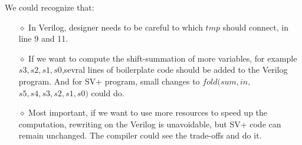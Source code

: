 We could recognize that:
\begin{itemize}
  \item[$\diamond$] In Verilog, designer needs to be careful to which $tmp$ should connect, in line 9 and 11.
  \item[$\diamond$] If we want to compute the shift-summation of more variables, for example $s3,s2,s1,s0$,sevral
                    lines of boilerplate code should be added to the Verilog program. And for SV+ program, small
                    changes to $fold(sum,in,$ $s5,s4,s3,s2,s1,s0)$ could do.
  \item[$\diamond$] Most important, if we want to use more resources to speed up the computation, rewriting on
                    the
                    Verilog is unavoidable, but SV+ code can remain unchanged. The compiler could see the
                    trade-offs and do it.
\end{itemize}
